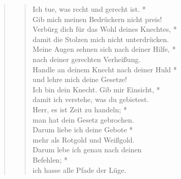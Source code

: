 \begin{quote}
\begin{verse}
 
  Ich tue, was recht und gerecht ist. *\\
Gib mich meinen Bedrückern nicht preis!\\ \vin
 Verbürg dich für das Wohl deines Knechtes, *\\ \vin
damit die Stolzen mich nicht unterdrücken.\\
 Meine Augen sehnen sich nach deiner Hilfe, *\\
nach deiner gerechten Verheißung.\\ \vin
 Handle an deinem Knecht nach deiner Huld *\\ \vin
und lehre mich deine Gesetze!\\
 Ich bin dein Knecht. Gib mir Einsicht, *\\
damit ich verstehe, was du gebietest.\\ \vin
 Herr, es ist Zeit zu handeln; *\\ \vin
man hat dein Gesetz gebrochen.\\
 Darum liebe ich deine Gebote *\\
mehr als Rotgold und Weißgold.\\ \vin 
 Darum lebe ich genau nach deinen\\ \vin  Befehlen; *\\ \vin
ich hasse alle Pfade der Lüge.\\                          
\end{verse}
\end{quote}